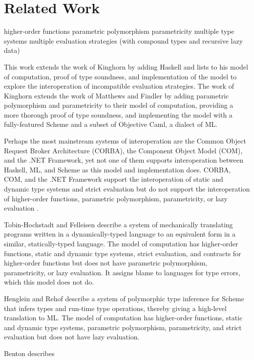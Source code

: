 \chapter{Related Work}

higher-order functions
parametric polymorphism
parametricity
multiple type systems
multiple evaluation strategies (with compound types and recursive lazy data)

This work extends the work of Kinghorn \cite{kinghorn07} by adding Haskell and lists to his model of computation, proof of type soundness, and implementation of the model to explore the interoperation of incompatible evaluation strategies.  The work of Kinghorn extends the work of Matthews and Findler \cite{matthews07} by adding parametric polymorphism and parametricity to their model of computation, providing a more thorough proof of type soundness, and implementing the model with a fully-featured Scheme and a subset of Objective Caml, a dialect of ML.

Perhaps the most mainstream systems of interoperation are the Common Object Request Broker Architecture (CORBA), the Component Object Model (COM), and the .NET Framework, yet not one of them supports interoperation between Haskell, ML, and Scheme as this model and implementation does.  CORBA, COM, and the .NET Framework support the interoperation of static and dynamic type systems and strict evaluation but do not support the interoperation of higher-order functions, parametric polymorphism, parametricity, or lazy evaluation \cite{omg04} \cite{microsoft07} \cite{ecma06}.

Tobin-Hochstadt and Felleisen \cite{tobin-hochstadt06} describe a system of mechanically translating programs written in a dynamically-typed language to an equivalent form in a similar, statically-typed language.  The model of computation has higher-order functions, static and dynamic type systems, strict evaluation, and contracts for higher-order functions but does not have parametric polymorphism, parametricity, or lazy evaluation.  It assigns blame to languages for type errors, which this model does not do.

Henglein and Rehof \cite{henglein95} describe a system of polymorphic type inference for Scheme that infers types and run-time type operations, thereby giving a high-level translation to ML.  The model of computation has higher-order functions, static and dynamic type systems, parametric polymorphism, parametricity, and strict evaluation but does not have lazy evaluation.

Benton \cite{benton05} describes 